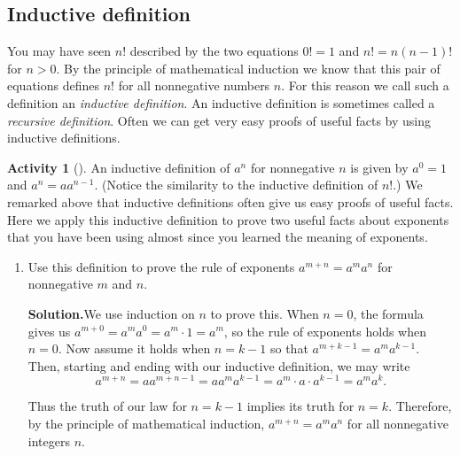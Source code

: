\documentclass[10pt,]{book}
\theoremstyle{plain}
\theoremstyle{definition}
\newtheorem{activity}[project]{Activity}
\numberwithin{equation}{chapter}
\begin{document}
\subsection[{Inductive definition}]{Inductive definition}\label{subsection-13}
You may have seen \(n!\) described by the two equations \(0!=1\) and \(n!=n(n-1)!\) for \(n>0\). By the principle of mathematical induction we know that this pair of equations defines \(n!\) for all nonnegative numbers \(n\). For this reason we call such a definition an \emph{inductive definition}. An inductive definition is sometimes called a \emph{recursive definition}. Often we can get very easy proofs of useful facts by using inductive definitions.%
\begin{activity}[]\label{activity-74}
An inductive definition of \(a^n\) for nonnegative \(n\) is given by \(a^0=1\) and \(a^n=aa^{n-1}\). (Notice the similarity to the inductive definition of \(n!\).) We remarked above that inductive definitions often give us easy proofs of useful facts. Here we apply this inductive definition to prove two useful facts about exponents that you have been using almost since you learned the meaning of exponents.%
~\par
\begin{enumerate}[label=(\alph*)]
 \item Use this definition to prove the rule of exponents \(a^{m+n}=a^ma^n\) for nonnegative \(m\) and \(n\).%
\par\medskip\noindent%
\textbf{Solution.}\quad We use induction on \(n\) to prove this. When \(n=0\), the formula gives us \(a^{m+0} =a^ma^0=a^m\cdot 1=a^m\), so the rule of exponents holds when \(n=0\). Now assume it holds when \(n=k-1\) so that \(a^{m+k-1}=a^ma^{k-1}\). Then, starting and ending with our inductive definition, we may write%
\begin{equation*}
a^{m+n}=aa^{m+n-1}=aa^ma^{k-1}=a^m\cdot a\cdot a^{k-1}=a^ma^k.
\end{equation*}
%
\par
Thus the truth of our law for \(n=k-1\) implies its truth for \(n=k\). Therefore, by the principle of mathematical induction, \(a^{m+n}=a^ma^n\) for all nonnegative integers \(n\).%


\end{enumerate}
\end{activity}
\end{document}
